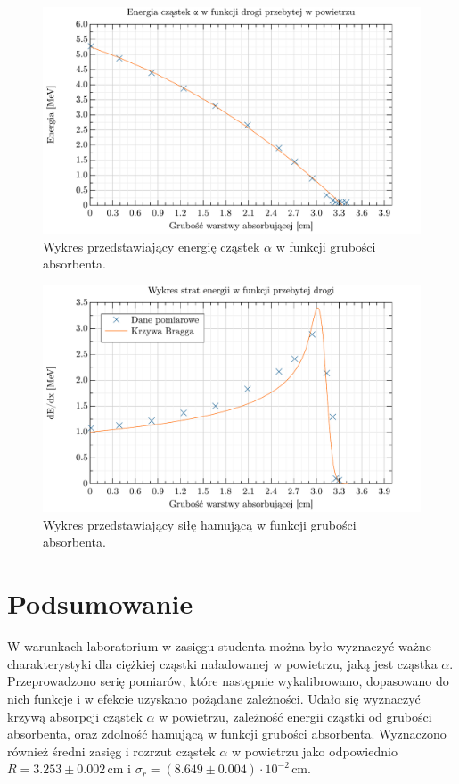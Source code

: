 \documentclass[12pt,a4paper]{article}
\begin{document}
\begin{figure}[h!]
    \centering
    \includegraphics[keepaspectratio, width=0.8\linewidth]{energia_vs_absorber.pdf}
    \caption{Wykres przedstawiający energię cząstek $\alpha$ w funkcji grubości absorbenta.}
    \label{fig:energia_absorber}
\end{figure}

\begin{figure}[h!]
    \centering
    \includegraphics[keepaspectratio, width=0.8\linewidth]{bardziejkrzywaBragga.pdf}
    \caption{Wykres przedstawiający siłę hamującą w funkcji grubości absorbenta.}
    \label{fig:stopping_power}
\end{figure}

\FloatBarrier
\section{Podsumowanie}

W warunkach laboratorium w zasięgu studenta można było wyznaczyć ważne charakterystyki dla ciężkiej cząstki naładowanej w powietrzu, jaką jest cząstka $\alpha$. Przeprowadzono serię pomiarów, które następnie wykalibrowano, dopasowano do nich funkcje i w efekcie uzyskano pożądane zależności. Udało się wyznaczyć krzywą absorpcji cząstek $\alpha$ w powietrzu, zależność energii cząstki od grubości absorbenta, oraz zdolność hamującą w funkcji grubości absorbenta. Wyznaczono również średni zasięg i rozrzut cząstek $\alpha$ w powietrzu jako odpowiednio $\bar{R} = 3.253 \pm 0.002$\,cm i $\sigma_r = (8.649 \pm 0.004)\cdot 10^{-2}$\,cm.
  
\end{document}
